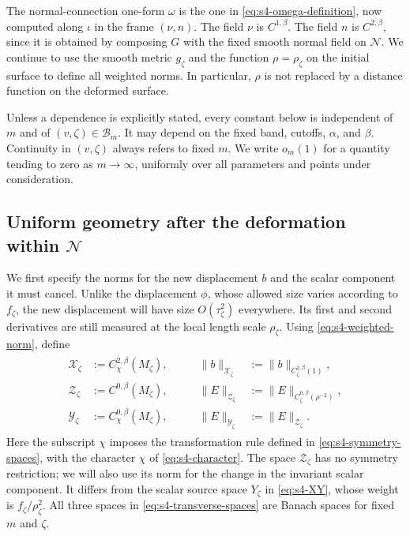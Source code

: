 \documentclass[a4paper,11pt,oneside,reqno]{amsart}
\numberwithin{equation}{section}
\theoremstyle{definition}
\begin{document}
The normal-connection one-form $\omega$ is the one in
\eqref{eq:s4-omega-definition}, now computed along $\iota$
in the frame $(\nu,n)$. The field $\nu$ is $C^{1,\beta}$.
The field $n$ is $C^{2,\beta}$, since it is obtained by
composing $G$ with the fixed smooth normal field on
$\mathcal N$. We continue to use the smooth metric
$g_\zeta$ and the function $\rho=\rho_\zeta$ on the
initial surface to define all weighted norms. In particular,
$\rho$ is not replaced by a distance function on the
deformed surface.

Unless a dependence is explicitly stated, every constant
below is independent of $m$ and of $(v,\zeta)\in\mathcal B_m$.
It may depend on the fixed band, cutoffs, $\alpha$, and
$\beta$. Continuity in $(v,\zeta)$ always refers to fixed
$m$. We write $o_m(1)$ for a quantity tending to zero as
$m\to\infty$, uniformly over all parameters and points
under consideration.

\subsection{Uniform geometry after the deformation within $\mathcal N$}

We first specify the norms for the new displacement $b$ and
the scalar component it must cancel. Unlike the displacement
$\phi$, whose allowed size varies according to $f_\zeta$,
the new displacement will have size $O(\tau_\zeta^2)$
everywhere. Its first and second derivatives are still
measured at the local length scale $\rho_\zeta$.
Using \eqref{eq:s4-weighted-norm}, define
%
\begin{align}
    \label{eq:s4-transverse-spaces}
    \begin{aligned}
        \mathcal X_\zeta&:=C^{2,\beta}_\chi(M_\zeta),
        &\qquad\|b\|_{\mathcal X_\zeta}
          &:=\|b\|_{C^{2,\beta}_\zeta(1)},\\
        \mathcal Z_\zeta&:=C^{0,\beta}(M_\zeta),
        &\qquad\|E\|_{\mathcal Z_\zeta}
          &:=\|E\|_{C^{0,\beta}_\zeta(\rho^{-2})},\\
        \mathcal Y_\zeta&:=C^{0,\beta}_\chi(M_\zeta),
        &\qquad\|E\|_{\mathcal Y_\zeta}
          &:=\|E\|_{\mathcal Z_\zeta}.
    \end{aligned}
\end{align}
%
Here the subscript $\chi$ imposes the transformation rule
defined in \eqref{eq:s4-symmetry-spaces}, with the character
$\chi$ of \eqref{eq:s4-character}. The space
$\mathcal Z_\zeta$ has no symmetry restriction; we will
also use its norm for the change in the invariant scalar
component. It differs from the scalar source space
$Y_\zeta$ in \eqref{eq:s4-XY}, whose weight is
$f_\zeta/\rho_\zeta^2$. All three spaces in
\eqref{eq:s4-transverse-spaces} are Banach spaces for
fixed $m$ and $\zeta$.
\end{document}
